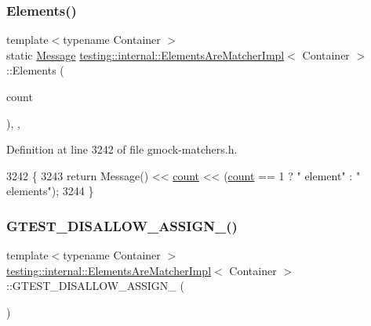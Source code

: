 \subsubsection{\texorpdfstring{Elements()}{Elements()}}
{\footnotesize\ttfamily template$<$typename Container $>$ \\
static \hyperlink{classtesting_1_1Message}{Message} \hyperlink{classtesting_1_1internal_1_1ElementsAreMatcherImpl}{testing\+::internal\+::\+Elements\+Are\+Matcher\+Impl}$<$ Container $>$\+::Elements (\begin{DoxyParamCaption}\item[{size\+\_\+t}]{count }\end{DoxyParamCaption})\hspace{0.3cm}{\ttfamily [inline]}, {\ttfamily [static]}, {\ttfamily [private]}}



Definition at line 3242 of file gmock-\/matchers.\+h.


\begin{DoxyCode}
3242                                         \{
3243     \textcolor{keywordflow}{return} Message() << \hyperlink{classtesting_1_1internal_1_1ElementsAreMatcherImpl_a8a8cf605a9fdc0eb8855fe9ce1aafb1e}{count} << (\hyperlink{classtesting_1_1internal_1_1ElementsAreMatcherImpl_a8a8cf605a9fdc0eb8855fe9ce1aafb1e}{count} == 1 ? \textcolor{stringliteral}{" element"} : \textcolor{stringliteral}{" elements"});
3244   \}
\end{DoxyCode}
\mbox{\label{classtesting_1_1internal_1_1ElementsAreMatcherImpl_ab77985a10f91fe7cbf1a30883e23cb06}} 
\subsubsection{\texorpdfstring{G\+T\+E\+S\+T\+\_\+\+D\+I\+S\+A\+L\+L\+O\+W\+\_\+\+A\+S\+S\+I\+G\+N\+\_\+()}{GTEST\_DISALLOW\_ASSIGN\_()}}
{\footnotesize\ttfamily template$<$typename Container $>$ \\
\hyperlink{classtesting_1_1internal_1_1ElementsAreMatcherImpl}{testing\+::internal\+::\+Elements\+Are\+Matcher\+Impl}$<$ Container $>$\+::G\+T\+E\+S\+T\+\_\+\+D\+I\+S\+A\+L\+L\+O\+W\+\_\+\+A\+S\+S\+I\+G\+N\+\_\+ (\begin{DoxyParamCaption}\item[{\hyperlink{classtesting_1_1internal_1_1ElementsAreMatcherImpl}{Elements\+Are\+Matcher\+Impl}$<$ Container $>$}]{ }\end{DoxyParamCaption})\hspace{0.3cm}{\ttfamily [private]}}

